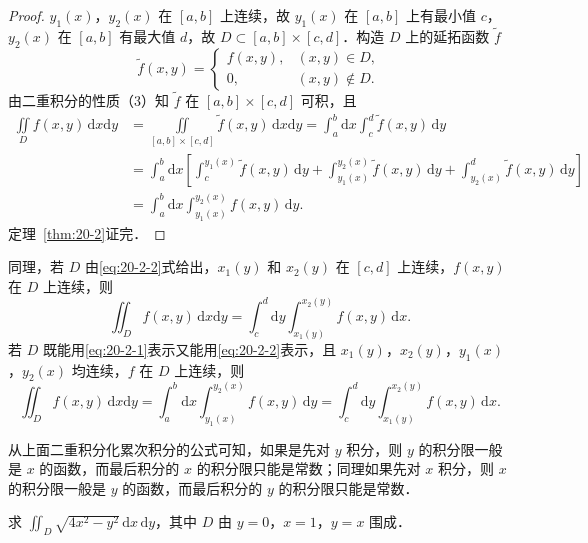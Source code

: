 \begin{proof}
$y_{1}(x)$，$y_{2}(x)$ 在 $[a,b]$ 上连续，故 $y_{1}(x)$ 在 $[a,b]$ 上有最小值 $c$，$y_{2}(x)$ 在 $[a,b]$ 有最大值 $d$，故 $D\subset[a,b]\times[c,d]$．构造 $D$ 上的延拓函数 $\tilde{f}$
\[
\tilde{f}(x,y)=\begin{cases}
f(x,y), & (x,y)\in D,\\
0, & (x,y)\notin D.
\end{cases}
\]
由二重积分的性质（3）知 $\tilde{f}$ 在 $[a,b]\times[c,d]$ 可积，且
\[
\begin{aligned}
\iint\limits_{D}f(x,y)\,\mathrm{d}x\mathrm{d}y&=\iint\limits_{[a,b]\times[c,d]}\tilde{f}(x,y)\,\mathrm{d}x\mathrm{d}y
=\int_{a}^{b}\mathrm{d}x\int_{c}^{d}\tilde{f}(x,y)\,\mathrm{d}y\\
&=\int_{a}^{b}\mathrm{d}x\left[\int_{c}^{y_{1}(x)}\tilde{f}(x,y)\,\mathrm{d}y+\int_{y_{1}(x)}^{y_{2}(x)}\tilde{f}(x,y)\,\mathrm{d}y+\int_{y_{2}(x)}^{d}\tilde{f}(x,y)\,\mathrm{d}y\right]\\
&=\int_{a}^{b}\mathrm{d}x\int_{y_{1}(x)}^{y_{2}(x)}f(x,y)\,\mathrm{d}y.
\end{aligned}
\]
定理~\ref{thm:20-2}证完．
\end{proof}

同理，若 $D$ 由\eqref{eq:20-2-2}式给出，$x_{1}(y)$ 和 $x_{2}(y)$ 在 $[c,d]$ 上连续，$f(x,y)$ 在 $D$ 上连续，则
\[
\iint_{D}f(x,y)\,\mathrm{d}x\mathrm{d}y=\int_{c}^{d}\mathrm{d}y\int_{x_{1}(y)}^{x_{2}(y)}f(x,y)\,\mathrm{d}x.
\]
若 $D$ 既能用\eqref{eq:20-2-1}表示又能用\eqref{eq:20-2-2}表示，且 $x_{1}(y)$，$x_{2}(y)$，$y_{1}(x)$，$y_{2}(x)$ 均连续，$f$ 在 $D$ 上连续，则
\[
\iint_{D}f(x,y)\,\mathrm{d}x\mathrm{d}y=\int_{a}^{b}\mathrm{d}x\int_{y_{1}(x)}^{y_{2}(x)}f(x,y)\,\mathrm{d}y=\int_{c}^{d}\mathrm{d}y\int_{x_{1}(y)}^{x_{2}(y)}f(x,y)\,\mathrm{d}x.
\]

从上面二重积分化累次积分的公式可知，如果是先对 $y$ 积分，则 $y$ 的积分限一般是 $x$ 的函数，而最后积分的 $x$ 的积分限只能是常数；同理如果先对 $x$ 积分，则 $x$ 的积分限一般是 $y$ 的函数，而最后积分的 $y$ 的积分限只能是常数．

\begin{example}\label{ex:20-2-2}
求 $\displaystyle\iint_{D}\sqrt{4x^{2}-y^{2}}\,\mathrm{d}x\,\mathrm{d}y$，其中 $D$ 由 $y=0$，$x=1$，$y=x$ 围成．
\end{example}

